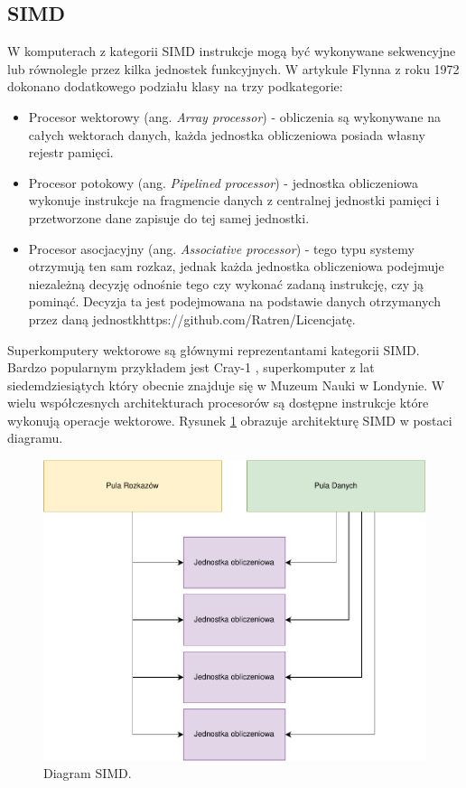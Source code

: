 \documentclass[a4paper,12pt]{book} %
\begin{document}
\subsection{SIMD}
W komputerach z kategorii SIMD instrukcje mogą być wykonywane sekwencyjne lub równolegle przez kilka jednostek funkcyjnych. W artykule Flynna z roku 1972 \cite{Flynn1972} dokonano dodatkowego podziału klasy na trzy podkategorie:
\begin{itemize}
	\item Procesor wektorowy (ang. \emph{Array processor}) - obliczenia są wykonywane na całych wektorach danych, każda jednostka obliczeniowa posiada własny rejestr pamięci.
	\item Procesor potokowy (ang. \emph{Pipelined processor}) - jednostka obliczeniowa wykonuje instrukcje na fragmencie danych z centralnej jednostki pamięci i przetworzone dane zapisuje do tej samej jednostki.
	\item Procesor asocjacyjny (ang. \emph{Associative processor}) - tego typu systemy otrzymują ten sam rozkaz, jednak każda jednostka obliczeniowa podejmuje niezależną decyzję odnośnie tego czy wykonać zadaną instrukcję, czy ją pominąć. Decyzja ta jest podejmowana na podstawie danych otrzymanych przez daną jednostkhttps://github.com/Ratren/Licencjatę.
\end{itemize}
Superkomputery wektorowe są głównymi reprezentantami kategorii SIMD. Bardzo popularnym przykładem jest Cray-1 \cite{Cray-1}, superkomputer z lat siedemdziesiątych który obecnie znajduje się w Muzeum Nauki w Londynie. W wielu współczesnych architekturach procesorów są dostępne instrukcje które wykonują operacje wektorowe. Rysunek \ref{fig:simd} obrazuje architekturę SIMD w postaci diagramu.
\begin{figure}
	\centering
	\includegraphics[scale=1]{assets/SIMD.pdf}
	\caption{Diagram SIMD.}
	\label{fig:simd}
\end{figure}
\end{document}
